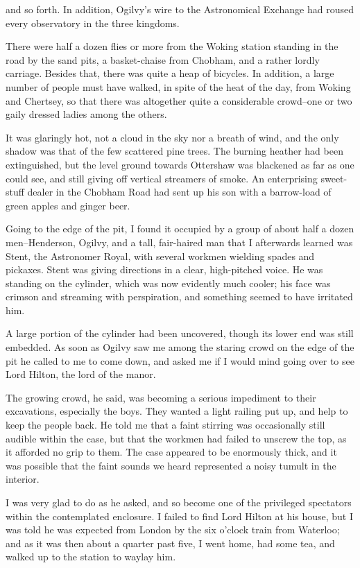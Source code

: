 and so forth. In addition, Ogilvy's wire to the Astronomical
Exchange had roused every observatory in the three kingdoms.

There were half a dozen flies or more from the Woking station
standing in the road by the sand pits, a basket-chaise from
Chobham, and a rather lordly carriage. Besides that, there was
quite a heap of bicycles. In addition, a large number of people
must have walked, in spite of the heat of the day, from Woking and
Chertsey, so that there was altogether quite a considerable
crowd--one or two gaily dressed ladies among the others.

It was glaringly hot, not a cloud in the sky nor a breath of wind,
and the only shadow was that of the few scattered pine trees. The
burning heather had been extinguished, but the level ground towards
Ottershaw was blackened as far as one could see, and still giving
off vertical streamers of smoke. An enterprising sweet-stuff dealer
in the Chobham Road had sent up his son with a barrow-load of green
apples and ginger beer.

Going to the edge of the pit, I found it occupied by a group of
about half a dozen men--Henderson, Ogilvy, and a tall, fair-haired
man that I afterwards learned was Stent, the Astronomer Royal, with
several workmen wielding spades and pickaxes. Stent was giving
directions in a clear, high-pitched voice. He was standing on the
cylinder, which was now evidently much cooler; his face was crimson
and streaming with perspiration, and something seemed to have
irritated him.

A large portion of the cylinder had been uncovered, though its
lower end was still embedded. As soon as Ogilvy saw me among the
staring crowd on the edge of the pit he called to me to come down,
and asked me if I would mind going over to see Lord Hilton, the
lord of the manor.

The growing crowd, he said, was becoming a serious impediment to
their excavations, especially the boys. They wanted a light railing
put up, and help to keep the people back. He told me that a faint
stirring was occasionally still audible within the case, but that
the workmen had failed to unscrew the top, as it afforded no grip
to them. The case appeared to be enormously thick, and it was
possible that the faint sounds we heard represented a noisy tumult
in the interior.

I was very glad to do as he asked, and so become one of the
privileged spectators within the contemplated enclosure. I failed
to find Lord Hilton at his house, but I was told he was expected
from London by the six o'clock train from Waterloo; and as it was
then about a quarter past five, I went home, had some tea, and
walked up to the station to waylay him.


